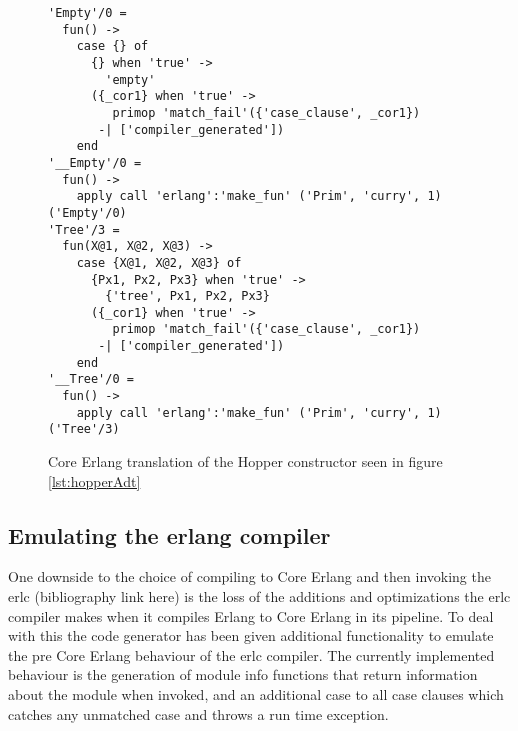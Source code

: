 \begin{figure}[!htb]
\centering
\begin{lstlisting}
'Empty'/0 =
  fun() ->
    case {} of
      {} when 'true' ->
        'empty'
      ({_cor1} when 'true' ->
         primop 'match_fail'({'case_clause', _cor1})
       -| ['compiler_generated'])
    end
'__Empty'/0 =
  fun() ->
    apply call 'erlang':'make_fun' ('Prim', 'curry', 1)('Empty'/0)
'Tree'/3 =
  fun(X@1, X@2, X@3) ->
    case {X@1, X@2, X@3} of
      {Px1, Px2, Px3} when 'true' ->
        {'tree', Px1, Px2, Px3}
      ({_cor1} when 'true' ->
         primop 'match_fail'({'case_clause', _cor1})
       -| ['compiler_generated'])
    end
'__Tree'/0 =
  fun() ->
    apply call 'erlang':'make_fun' ('Prim', 'curry', 1)('Tree'/3)
\end{lstlisting}
\caption[Generated Core Erlang translation of constructor]
 {Core Erlang translation of the Hopper constructor seen in figure \ref{lst:hopperAdt}}
\label{lst:coreCon}
\end{figure}

\subsection{Emulating the erlang compiler}

One downside to the choice of compiling to Core Erlang and then invoking the erlc
(bibliography link here) is the loss of the additions and optimizations the erlc
compiler makes when it compiles Erlang to Core Erlang in its pipeline. To deal with this
the code generator has been given additional functionality to emulate the pre Core Erlang
behaviour of the erlc compiler. The currently implemented behaviour is the generation of module info functions that return information about the module when invoked, and an additional case to all case clauses which catches any unmatched case and throws a run time exception.